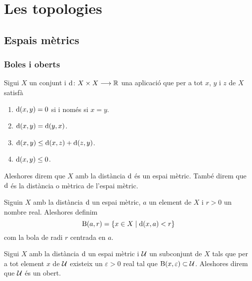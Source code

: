 \documentclass[../Apunts.tex]{subfiles}
\begin{document}
\chapter{Les topologies}
	\section{Espais mètrics}
	\subsection{Boles i oberts}
	\begin{definition}
		\label{def:espai mètric}
		\label{def:distància}
		Sigui \(X\) un conjunt i \(\operatorname{d}\colon X\times X\longrightarrow\mathbb{R}\) una aplicació que per a tot \(x\), \(y\) i \(z\) de \(X\) satisfà
		\begin{enumerate}
			\item \(\operatorname{d}(x,y)=0\) si i només si \(x=y\).
			\item \(\operatorname{d}(x,y)=\operatorname{d}(y,x)\).
			\item \(\operatorname{d}(x,y)\leq\operatorname{d}(x,z)+\operatorname{d}(z,y)\).
			\item \(\operatorname{d}(x,y)\leq0\).
		\end{enumerate}
		Aleshores direm que \(X\) amb la distància \(\operatorname{d}\) és un espai mètric. També direm que \(\operatorname{d}\) és la distància o mètrica de l'espai mètric.
	\end{definition}
	\begin{definition}[Bola]
		\label{def:bola}
		Siguin \(X\) amb la distància \(\operatorname{d}\) un espai mètric, \(a\) un element de \(X\) i \(r>0\) un nombre real. Aleshores definim
		\[\operatorname{B}(a,r)=\{x\in X\mid\operatorname{d}(x,a)<r\}\]
		com la bola de radi \(r\) centrada en \(a\).
	\end{definition}
	\begin{definition}[Obert]
		\label{def:obert espai mètric}
		Sigui \(X\) amb la distància \(\operatorname{d}\) un espai mètric i \(\mathcal{U}\) un subconjunt de \(X\) tals que per a tot element \(x\) de \(\mathcal{U}\) existeix un \(\varepsilon>0\) real tal que \(\operatorname{B}(x,\varepsilon)\subset\mathcal{U}\). Aleshores direm que \(\mathcal{U}\) és un obert.
	\end{definition}
\end{document}
